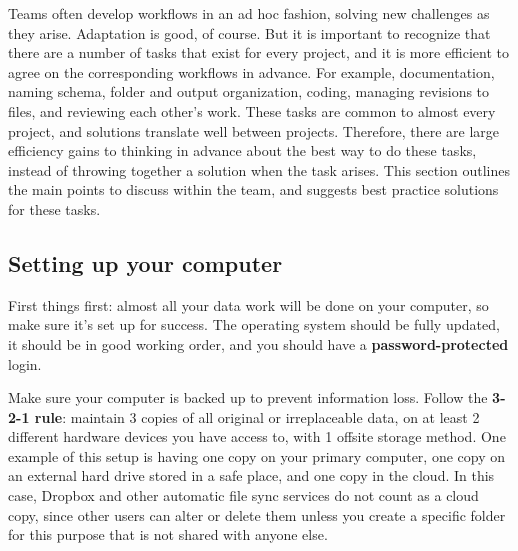 Teams often develop workflows in an ad hoc fashion,
solving new challenges as they arise.
Adaptation is good, of course.
But it is important to recognize
that there are a number of tasks that exist for every project,
and it is more efficient to agree on the corresponding workflows in advance.
For example, documentation, naming schema, folder and output organization,
coding, managing revisions to files, and reviewing each other's work.
These tasks are common to almost every project,
and solutions translate well between projects.
Therefore, there are large efficiency gains to
thinking in advance about the best way to do these tasks,
instead of throwing together a solution when the task arises.
This section outlines the main points to discuss within the team,
and suggests best practice solutions for these tasks.

\subsection{Setting up your computer}

First things first:
almost all your data work will be done on your computer,
so make sure it's set up for success.
The operating system should be fully updated,
it should be in good working order,
and you should have a \textbf{password-protected} login.

Make sure your computer is backed up to prevent information loss.
Follow the \textbf{3-2-1 rule}: maintain 3 copies of all original or irreplaceable data,
on at least 2 different hardware devices you have access to,
with 1 offsite storage method.
One example of this setup is having one copy on your primary computer,
one copy on an external hard drive stored in a safe place,
and one copy in the cloud.
In this case, Dropbox and other automatic file sync services do not count as a cloud copy,
since other users can alter or delete them
unless you create a specific folder for this purpose that is not shared with anyone else.

